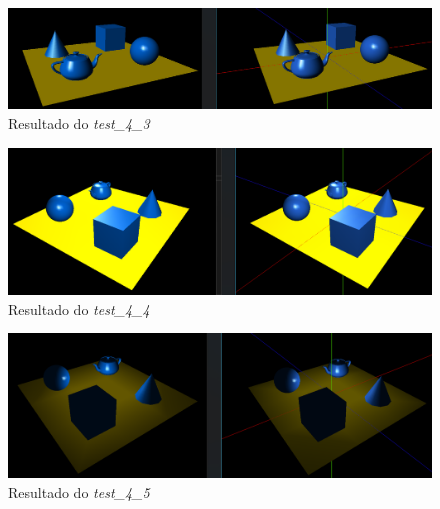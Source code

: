 \documentclass[runningheads]{llncs}
\begin{document}
    \begin{landscape}
        \begin{figure}
            \centering
            \includegraphics[width=\linewidth]{assets/testes/teste_4_3.png}
            \caption{Resultado do \textit{test\_4\_3}} \label{fig:teste_4_3}
        \end{figure}
    \end{landscape}

    \begin{landscape}
        \begin{figure}
            \centering
            \includegraphics[width=\linewidth]{assets/testes/teste_4_4.png}
            \caption{Resultado do \textit{test\_4\_4}} \label{fig:teste_4_4}
        \end{figure}
    \end{landscape}

    \begin{landscape}
        \begin{figure}
            \centering
            \includegraphics[width=\linewidth]{assets/testes/teste_4_5.png}
            \caption{Resultado do \textit{test\_4\_5}} \label{fig:teste_4_5}
        \end{figure}
    \end{landscape}
\end{document}
